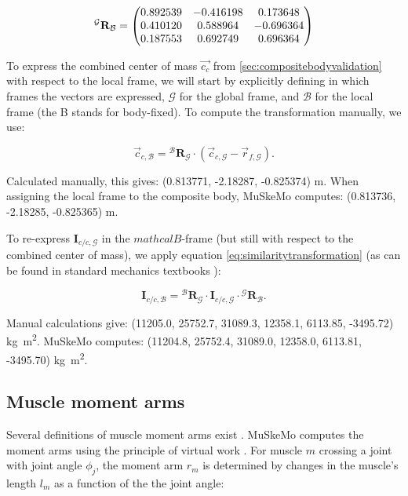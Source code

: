 \documentclass{article}
\begin{document}
\begin{equation}
    {}^{\mathcal{G}} \mathbf{R}_{\mathcal{B}} =
    \mqty(
    0.892539 & -0.416198 & 0.173648 \\
    0.410120 & 0.588964 & -0.696364 \\
    0.187553 & 0.692749 & 0.696364
    )
\end{equation}

To express the combined center of mass \(\vec{c_{c}}\) from \ref{sec:compositebodyvalidation} with respect to the local frame, we will start by explicitly defining in which frames the vectors are expressed, \(\mathcal{G}\) for the global frame, and \(\mathcal{B}\) for the local frame (the B stands for body-fixed). To compute the transformation manually, we use:

\begin{equation}
\vec{c}_{c,\mathcal{B}} = {}^{\mathcal{B}} \mathbf{R}_{\mathcal{G}} \cdot (\vec{c}_{c,\mathcal{G}} - \vec{r}_{f,\mathcal{G}}).
\end{equation}

Calculated manually, this gives: (0.813771, -2.18287, -0.825374) \si{m}. When assigning the local frame to the composite body, MuSkeMo computes: (0.813736, -2.18285, -0.825365) \si{m}. 

To re-express \(\mathbf{I}_{c/c,{\mathcal{G}}}\) in the \(mathcal{B}\)-frame (but still with respect to the combined center of mass), we apply equation \ref{eq:similaritytransformation} (as can be found in standard mechanics textbooks \cite{valleryAdvancedDynamics2019}):

\begin{equation}
    \mathbf{I}_{c/c,{\mathcal{B}}} = {}^{\mathcal{B}} \mathbf{R}_{\mathcal{G}} \cdot \mathbf{I}_{c/c,{\mathcal{G}}} \cdot {}^{\mathcal{G}} \mathbf{R}_{\mathcal{B}}.
\end{equation}

Manual calculations give: (11205.0, 25752.7, 31089.3, 12358.1, 6113.85, -3495.72) \si{kg m^2}. MuSkeMo computes: (11204.8, 25752.4, 31089.0, 12358.0, 6113.81, -3495.70) \si{kg m^2}.


\subsection{Muscle moment arms}
\label{sec:momentarmvalidation}

Several definitions of muscle moment arms exist \cite{anDeterminationMuscleOrientations1984}. MuSkeMo computes the moment arms using the principle of virtual work \cite{anDeterminationMuscleOrientations1984,storaceFunctionalAnalysisRole1979}. For muscle \(m\) crossing a joint with joint angle \(\phi_j\), the moment arm \(r_m\) is determined by changes in the muscle's length \(l_m\) as a function of the the joint angle:
\end{document}
